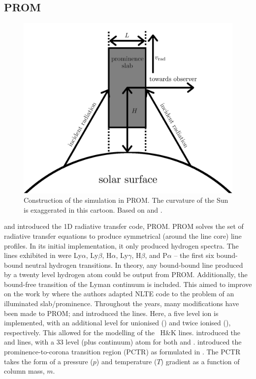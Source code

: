 \subsection{PROM}
\label{promintro}
\begin{figure}
    \centering
    \includegraphics*[]{./02Modelling1D/figs/20180419/prom.png}
    \caption[Construction of the simulation in PROM. Based on \cite{gouttebroze_formation_1997} and \cite{labrosse_effect_2007}.]{Construction of the simulation in PROM. The curvature of the Sun is exaggerated in this cartoon. Based on \cite{gouttebroze_formation_1997} and \cite{labrosse_effect_2007}.}
    \label{promsetup}
\end{figure}
\cite{gouttebroze_hydrogen_1993} and \cite{heinzel_theoretical_1994} introduced the 1D radiative transfer code, PROM. PROM solves the set of radiative transfer equations to produce symmetrical (around the line core) line profiles. In its initial implementation, it only produced hydrogen spectra. The lines exhibited in \cite{gouttebroze_hydrogen_1993} were Ly$\alpha$, Ly$\beta$, H$\alpha$, Ly$\gamma$, H$\beta$, and P$\alpha$ -- the first six bound-bound neutral hydrogen transitions. In theory, any bound-bound line produced by a twenty level hydrogen atom could be output from PROM. Additionally, the bound-free transition of the Lyman continuum is included. This aimed to improve on the work by \cite{heasley_theoretical_1974} where the authors adapted NLTE code to the problem of an illuminated slab/prominence. Throughout the years, many modifications have been made to PROM; \cite{gouttebroze_formation_1997} and \cite{gouttebroze_calcium_2002} introduced the  lines. Here, a five level  ion is implemented, with an additional level for unionised () and twice ionised (), respectively. This allowed for the modelling of the ~H\&K lines. \cite{labrosse_formation_2001} introduced the  and  lines, with a 33 level (plus continuum) atom for both  and . \cite{labrosse_nonlte_2004} introduced the prominence-to-corona transition region (PCTR) as formulated in \cite{anzer_energy_1999}. The PCTR takes the form of a pressure ($p$) and temperature ($T$) gradient as a function of column mass, $m$. 
